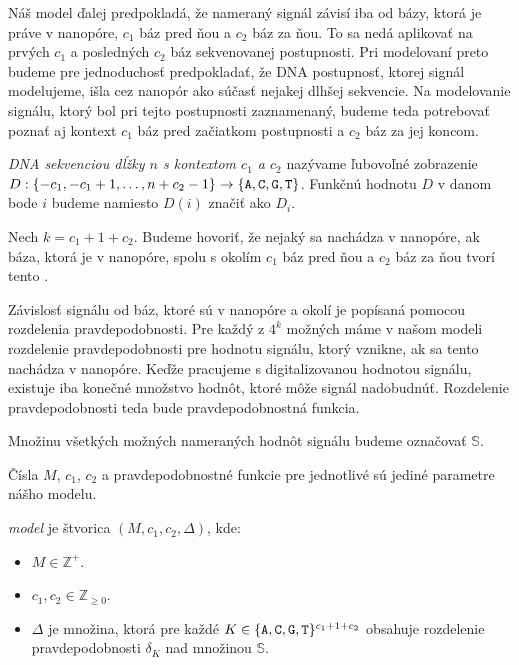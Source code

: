 Náš model ďalej predpokladá, že nameraný signál závisí iba od bázy, ktorá je práve v nanopóre, $c_1$
báz pred ňou a $c_2$ báz za ňou. To sa nedá aplikovať na prvých $c_1$ a posledných $c_2$ báz 
sekvenovanej postupnosti. Pri modelovaní preto budeme pre jednoduchosť predpokladať, že DNA postupnosť, 
ktorej signál modelujeme, išla cez nanopór ako súčasť nejakej dlhšej sekvencie. Na modelovanie
signálu, ktorý bol pri tejto postupnosti zaznamenaný, budeme teda potrebovať poznať aj 
kontext $c_1$ báz pred začiatkom postupnosti a $c_2$ báz za jej koncom.

\begin{definicia}

\emph{DNA sekvenciou dĺžky $n$ s kontextom $c_1$ a $c_2$} nazývame ľubovoľné zobrazenie 
$D: \{-c_1, -c_1+1, \dots, n+c_2 - 1\} \rightarrow \{\texttt{A}, \texttt{C}, \texttt{G}, \texttt{T}\}$. Funkčnú hodnotu $D$ v danom bode $i$
budeme namiesto $D(i)$ značiť ako $D_i$.

\end{definicia}

Nech $k = c_1 + 1 + c_2$. Budeme hovoriť, že nejaký \kmer{} sa nachádza v nanopóre, ak báza, 
ktorá je v nanopóre, spolu s okolím $c_1$ báz pred ňou a $c_2$ báz za ňou tvorí tento \kmer{}.

Závislosť signálu od báz, ktoré sú v nanopóre a okolí je popísaná pomocou rozdelenia pravdepodobnosti.
Pre každý z $4^k$ možných   máme v našom modeli rozdelenie 
pravdepodobnosti pre hodnotu signálu, ktorý vznikne, ak sa tento \kmer{} nachádza v nanopóre.
Keďže pracujeme s digitalizovanou hodnotou signálu, existuje iba konečné množstvo hodnôt, ktoré
môže signál nadobudnúť. Rozdelenie pravdepodobnosti teda bude pravdepodobnostná funkcia.

\begin{definicia}

Množinu všetkých možných nameraných hodnôt signálu budeme označovať $\mathbb{S}$.

\end{definicia}

Čísla $M$, $c_1$, $c_2$ a pravdepodobnostné funkcie pre jednotlivé  sú jediné
parametre nášho modelu.

\begin{definicia}

\emph{ model} je štvorica $(M, c_1, c_2, \Delta)$, kde:

\begin{itemize}
\item $M \in \mathbb{Z}^+$.
\item $c_1, c_2 \in \mathbb{Z}_{\geq 0}$.
\item $\Delta$ je množina, ktorá pre každé $K \in \{\texttt{A}, \texttt{C}, \texttt{G}, \texttt{T}\}^{c_1 + 1 + c_2}$ obsahuje rozdelenie pravdepodobnosti
$\delta_K$ nad množinou $\mathbb{S}$.
\end{itemize}
\end{definicia}


